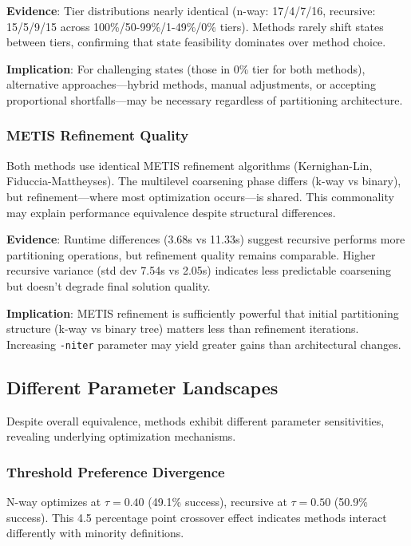 \textbf{Evidence}: Tier distributions nearly identical (n-way: 17/4/7/16, recursive: 15/5/9/15 across 100\%/50-99\%/1-49\%/0\% tiers). Methods rarely shift states between tiers, confirming that state feasibility dominates over method choice.

\textbf{Implication}: For challenging states (those in 0\% tier for both methods), alternative approaches—hybrid methods, manual adjustments, or accepting proportional shortfalls—may be necessary regardless of partitioning architecture.

\subsubsection{METIS Refinement Quality}

Both methods use identical METIS refinement algorithms (Kernighan-Lin, Fiduccia-Mattheyses). The multilevel coarsening phase differs (k-way vs binary), but refinement—where most optimization occurs—is shared. This commonality may explain performance equivalence despite structural differences.

\textbf{Evidence}: Runtime differences (3.68s vs 11.33s) suggest recursive performs more partitioning operations, but refinement quality remains comparable. Higher recursive variance (std dev 7.54s vs 2.05s) indicates less predictable coarsening but doesn't degrade final solution quality.

\textbf{Implication}: METIS refinement is sufficiently powerful that initial partitioning structure (k-way vs binary tree) matters less than refinement iterations. Increasing \texttt{-niter} parameter may yield greater gains than architectural changes.

\subsection{Different Parameter Landscapes}

Despite overall equivalence, methods exhibit different parameter sensitivities, revealing underlying optimization mechanisms.

\subsubsection{Threshold Preference Divergence}

N-way optimizes at $\tau=0.40$ (49.1\% success), recursive at $\tau=0.50$ (50.9\% success). This 4.5 percentage point crossover effect indicates methods interact differently with minority definitions.

